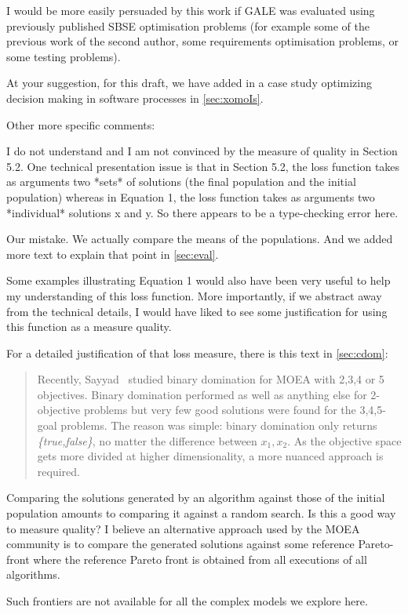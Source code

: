 \documentclass[10pt,journal,compsoc]{IEEEtran}
\newcommand{\tion}[1]{\textsection\ref{sec:#1}}
\newenvironment{changed}{\par\color{MyDarkBlue}}{\par}
\begin{document}
I
 would be more easily persuaded by this work if GALE
 was evaluated using previously published SBSE
 optimisation problems (for example some of the
 previous work of the second author, some
 requirements optimisation problems, or some testing
 problems). 
\begin{changed}
At your suggestion,
for this draft, we have added in a case study optimizing decision making in software processes in  \tion{xomoIs}.

\end{changed}

Other more specific comments:

I do not understand and I am not convinced by the measure of quality in Section 5.2. One technical presentation issue is that in Section 5.2, the loss function takes as arguments two *sets* of solutions (the final population and the initial population) whereas in Equation 1, the loss function takes as arguments two *individual* solutions x and y. So there appears to be a type-checking error here. 

\begin{changed}
Our mistake. We actually compare the means of the populations.
And we added more text to explain that point in \tion{eval}.

\end{changed}

Some examples illustrating Equation 1 would also have been very useful to help my understanding of this loss function. More importantly, if we abstract away from the technical details, I would have liked to see some justification for using this function as a measure quality. 
\begin{changed}
For a detailed justification of that loss measure, there is this text in \tion{cdom}:

\begin{quote}
 Recently, Sayyad~\cite{sayyad13a} studied binary domination for MOEA
with 2,3,4 or 5 objectives.  Binary domination performed as well as anything else
for 2-objective problems but very few good solutions were found for
the 3,4,5-goal problems.  The reason was simple: binary domination  only returns
{\em \{true,false\}}, no matter the difference between $x_1,x_2$. As the objective
space gets more divided at higher dimensionality, a more nuanced approach is required.
\end{quote}

\end{changed}

Comparing the solutions generated by an algorithm against those of the initial population amounts to comparing it against a random search. Is this a good way to measure quality? I believe an alternative approach used by the MOEA community is to compare the generated solutions against some reference Pareto-front where the reference Pareto front is obtained from all executions of all algorithms. 
\begin{changed}
Such frontiers are not available for all the complex models we explore here.
\end{changed}
\end{document}
